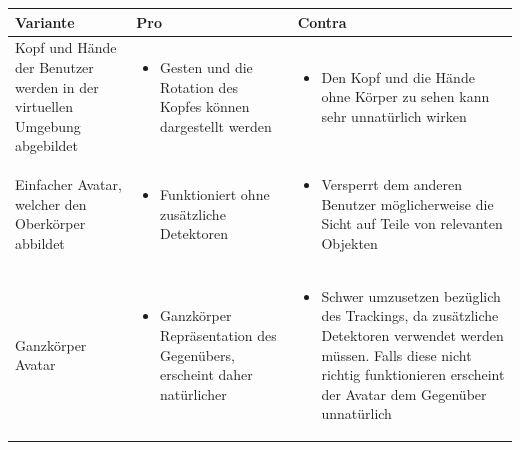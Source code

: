 \begin{center}
	\begin{tabularx} {\textwidth} { | B | B | B | }
		\hline
		\color{white} \textbf{Variante} & \color{white} \textbf{Pro} & 
		\color{white} \textbf{Contra} \\
		\hline
		\vspace{1pt}
		Kopf und Hände der Benutzer werden in der virtuellen Umgebung abgebildet & 
		\begin{itemize} [leftmargin=*,noitemsep,topsep=0pt]
			\item Gesten und die Rotation des Kopfes können dargestellt werden
		\end{itemize} & 
		\begin{itemize} [leftmargin=*,noitemsep,topsep=0pt]
			\item Den Kopf und die Hände ohne Körper zu sehen kann sehr unnatürlich wirken
		\end{itemize} \\
		\hline
		\vspace{1pt}
		Einfacher Avatar, welcher den Oberkörper abbildet & 
		\begin{itemize} [leftmargin=*,noitemsep,topsep=0pt]
			\item Funktioniert ohne zusätzliche Detektoren
		\end{itemize} & 
		\begin{itemize} [leftmargin=*,noitemsep,topsep=0pt]
			\item Versperrt dem anderen Benutzer möglicherweise die Sicht auf Teile von relevanten Objekten
		\end{itemize} \\
		\hline
		\vspace{1pt}
		Ganzkörper Avatar & 
		\begin{itemize} [leftmargin=*,noitemsep,topsep=0pt]
			\item Ganzkörper Repräsentation des Gegenübers, erscheint daher natürlicher
		\end{itemize} & 
		\begin{itemize} [leftmargin=*,noitemsep,topsep=0pt]
			\item Schwer umzusetzen bezüglich des Trackings, da zusätzliche Detektoren verwendet werden müssen. Falls diese nicht richtig funktionieren erscheint der Avatar dem Gegenüber unnatürlich
		\end{itemize} \\
		\hline	
	\end{tabularx}
\end{center}
\label{tbl:varianten_avatar}


